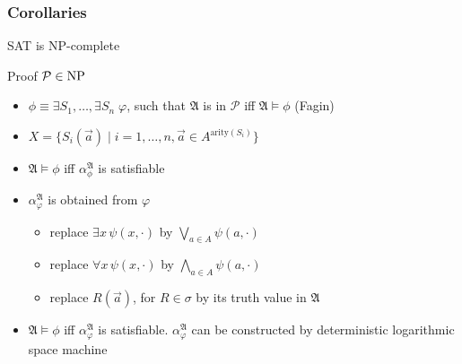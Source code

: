 \documentclass{beamer}
\newcommand{\NP}{{\rm NP}\xspace}
\newcommand{\SAT}{{\rm SAT}\xspace}
\newcommand{\structa}{\ensuremath{\mathfrak{A}}}
\begin{document}
\begin{frame}
  \frametitle{Corollaries}

  \begin{corollary}[Cook]
    \SAT is \NP-complete
  \end{corollary}

  \begin{alertblock}{Proof}
    $\mathcal{P} \in \NP$
    \begin{itemize}
      \item $\phi \equiv \exists S_1, \ldots, \exists S_n \; \varphi$, such that
      $\structa$ is in $\mathcal{P}$ iff $\structa \models \phi$ (Fagin)
      \item $X = \{S_i(\vec{a}) \; | \; i = 1, \ldots, n, \vec{a} \in
      A^{\text{arity}(S_i)}\}$
      \item $\structa \models \phi$ iff $\alpha_{\phi}^{\structa}$ is
      satisfiable
      \item $\alpha_{\varphi}^{\structa}$ is obtained from $\varphi$
        \begin{itemize}
          \item replace $\exists x \, \psi(x, \cdot)$ by $\bigvee_{a \in A}
          \psi(a, \cdot)$
          \item replace $\forall x \, \psi(x, \cdot)$ by $\bigwedge_{a \in A}
          \psi(a, \cdot)$
          \item replace $R(\vec{a})$, for $R \in \sigma$ by its truth value in
          $\structa$
        \end{itemize}
      \item $\structa \models \phi$ iff $\alpha_{\varphi}^{\structa}$ is
      satisfiable. $\alpha_{\varphi}^{\structa}$ can be constructed by
      deterministic logarithmic space machine
    \end{itemize}
  \end{alertblock}
  
\end{frame}

\section{}


\end{document}
